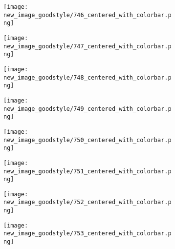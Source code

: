 \documentclass[a4paper,12pt]{article}
\begin{document}
\begin{figure}[H]
  \begin{subfigure}{0.11\textwidth}
    \texttt{[image: new\_image\_goodstyle/746\_centered\_with\_colorbar.png]}
  \end{subfigure}
  \hfill
  \begin{subfigure}{0.11\textwidth}
    \texttt{[image: new\_image\_goodstyle/747\_centered\_with\_colorbar.png]}
  \end{subfigure}
  \hfill
  \begin{subfigure}{0.11\textwidth}
    \texttt{[image: new\_image\_goodstyle/748\_centered\_with\_colorbar.png]}
  \end{subfigure}
  \hfill
  \begin{subfigure}{0.11\textwidth}
    \texttt{[image: new\_image\_goodstyle/749\_centered\_with\_colorbar.png]}
  \end{subfigure}
  \hfill
  \begin{subfigure}{0.11\textwidth}
    \texttt{[image: new\_image\_goodstyle/750\_centered\_with\_colorbar.png]}
  \end{subfigure}
  \hfill
  \begin{subfigure}{0.11\textwidth}
    \texttt{[image: new\_image\_goodstyle/751\_centered\_with\_colorbar.png]}
  \end{subfigure}
  \hfill
  \begin{subfigure}{0.11\textwidth}
    \texttt{[image: new\_image\_goodstyle/752\_centered\_with\_colorbar.png]}
  \end{subfigure}
  \hfill
  \begin{subfigure}{0.11\textwidth}
    \texttt{[image: new\_image\_goodstyle/753\_centered\_with\_colorbar.png]}
  \end{subfigure}
  \hfill
\end{figure}
\end{document}
